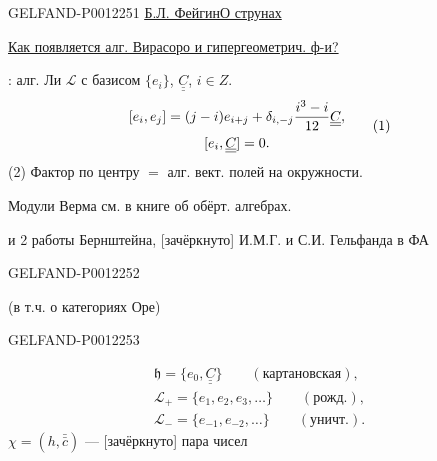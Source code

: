 \begin{GelfandAdjacentEvidence}{GELFAND-P001225}{1}
\underline{\underline{Б.Л. Фейгин}}\qquad\underline{О струнах}

\underline{Как появляется алг. Вирасоро и гипергеометрич. ф-и?}

: алг. Ли \(\mathcal L\) с базисом
\(\{e_i\}\), \(\underline{\underline{C}}\), \(i\in Z\).
\begin{equation*}
\begin{gathered}
\relax [e_i,e_j]=(j-i)e_{i+j}+\delta_{i,-j}\frac{i^3-i}{12}\underline{\underline{C}},\\[0pt]
[e_i,\underline{\underline{C}}]=0.
\end{gathered}\tag{1}
\end{equation*}
(2) Фактор по центру \(=\) алг. вект. полей на окружности.

Модули Верма см. в книге  об обёрт. алгебрах.

и 2 работы Бернштейна, [зачёркнуто] И.М.Г. и С.И. Гельфанда в ФА
\end{GelfandAdjacentEvidence}
\begin{GelfandAdjacentEvidence}{GELFAND-P001225}{2}


(в т.ч. о категориях Оре)
\end{GelfandAdjacentEvidence}
\begin{GelfandAdjacentEvidence}{GELFAND-P001225}{3}

\begin{equation*}
\begin{gathered}
\mathfrak h=\{e_0,\underline{\underline{C}}\}\qquad(\text{картановская}),\\
\mathcal L_+=\{e_1,e_2,e_3,\ldots\}\qquad(\text{рожд.}),\\
\mathcal L_-=\{e_{-1},e_{-2},\ldots\}\qquad(\text{уничт.}).
\end{gathered}
\end{equation*}
\(\chi=(h,\bar{\bar{c}})\) --- [зачёркнуто] пара чисел
\end{GelfandAdjacentEvidence}


